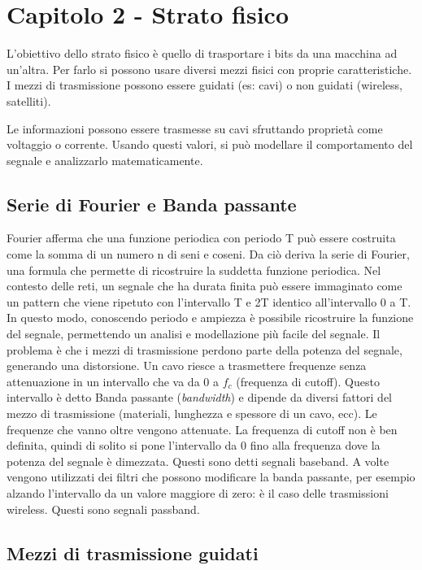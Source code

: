 \newpage

\section{Capitolo 2 - Strato fisico}

L'obiettivo dello strato fisico è quello di trasportare i bits da una macchina ad un'altra.
Per farlo si possono usare diversi mezzi fisici con proprie caratteristiche.
I mezzi di trasmissione possono essere guidati (es: cavi) o non guidati (wireless, satelliti).

Le informazioni possono essere trasmesse su cavi sfruttando proprietà come voltaggio o corrente. 
Usando questi valori, si può modellare il comportamento del segnale e analizzarlo matematicamente.

\subsection{Serie di Fourier e Banda passante}

Fourier afferma che una funzione periodica con periodo T può essere costruita come la somma di un numero n di seni e coseni.
Da ciò deriva la serie di Fourier, una formula che permette di ricostruire la suddetta funzione periodica. 
Nel contesto delle reti, un segnale che ha durata finita può essere immaginato come un pattern che viene ripetuto con l'intervallo T e 2T identico all’intervallo 0 a T.
In questo modo, conoscendo periodo e ampiezza è possibile ricostruire la funzione del segnale, permettendo un analisi e modellazione più facile del segnale.
Il problema è che i mezzi di trasmissione perdono parte della potenza del segnale, generando una distorsione.
Un cavo riesce a trasmettere frequenze senza attenuazione in un intervallo che va da 0 a $f_c$ (frequenza di cutoff).
Questo intervallo è detto Banda passante (\textit{bandwidth}) e dipende da diversi fattori del mezzo di trasmissione (materiali, lunghezza e spessore di un cavo, ecc).
Le frequenze che vanno oltre vengono attenuate.
La frequenza di cutoff non è ben definita, quindi di solito si pone l'intervallo da 0 fino alla frequenza dove la potenza del segnale è dimezzata.
Questi sono detti segnali baseband.
A volte vengono utilizzati dei filtri che possono modificare la banda passante, per esempio alzando l'intervallo da un valore maggiore di zero: è il caso delle trasmissioni wireless.
Questi sono segnali passband.

\subsection{Mezzi di trasmissione guidati}

